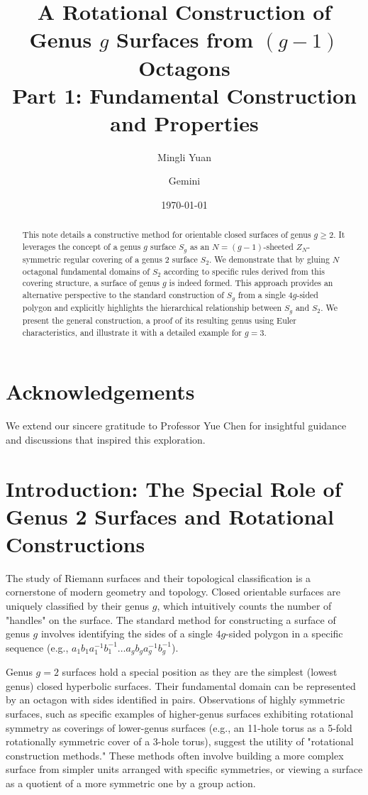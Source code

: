 \documentclass{article}
\title{A Rotational Construction of Genus $g$ Surfaces from $(g-1)$ Octagons\\ Part 1: Fundamental Construction and Properties}
\author{Mingli Yuan \and Gemini}
\date{\today}
\theoremstyle{definition}
\theoremstyle{remark}
\begin{document}
\maketitle

\begin{abstract}
This note details a constructive method for orientable closed surfaces of genus $g \ge 2$. It leverages the concept of a genus $g$ surface $S_g$ as an $N=(g-1)$-sheeted $Z_N$-symmetric regular covering of a genus 2 surface $S_2$. We demonstrate that by gluing $N$ octagonal fundamental domains of $S_2$ according to specific rules derived from this covering structure, a surface of genus $g$ is indeed formed. This approach provides an alternative perspective to the standard construction of $S_g$ from a single $4g$-sided polygon and explicitly highlights the hierarchical relationship between $S_g$ and $S_2$. We present the general construction, a proof of its resulting genus using Euler characteristics, and illustrate it with a detailed example for $g=3$.
\end{abstract}

\section*{Acknowledgements}
We extend our sincere gratitude to Professor Yue Chen for insightful guidance and discussions that inspired this exploration.

\section{Introduction: The Special Role of Genus 2 Surfaces and Rotational Constructions}

The study of Riemann surfaces and their topological classification is a cornerstone of modern geometry and topology. Closed orientable surfaces are uniquely classified by their genus $g$, which intuitively counts the number of "handles" on the surface. The standard method for constructing a surface of genus $g$ involves identifying the sides of a single $4g$-sided polygon in a specific sequence (e.g., $a_1 b_1 a_1^{-1} b_1^{-1} \ldots a_g b_g a_g^{-1} b_g^{-1}$).

Genus $g=2$ surfaces hold a special position as they are the simplest (lowest genus) closed hyperbolic surfaces. Their fundamental domain can be represented by an octagon with sides identified in pairs. Observations of highly symmetric surfaces, such as specific examples of higher-genus surfaces exhibiting rotational symmetry as coverings of lower-genus surfaces (e.g., an 11-hole torus as a 5-fold rotationally symmetric cover of a 3-hole torus), suggest the utility of "rotational construction methods." These methods often involve building a more complex surface from simpler units arranged with specific symmetries, or viewing a surface as a quotient of a more symmetric one by a group action.
\end{document}
